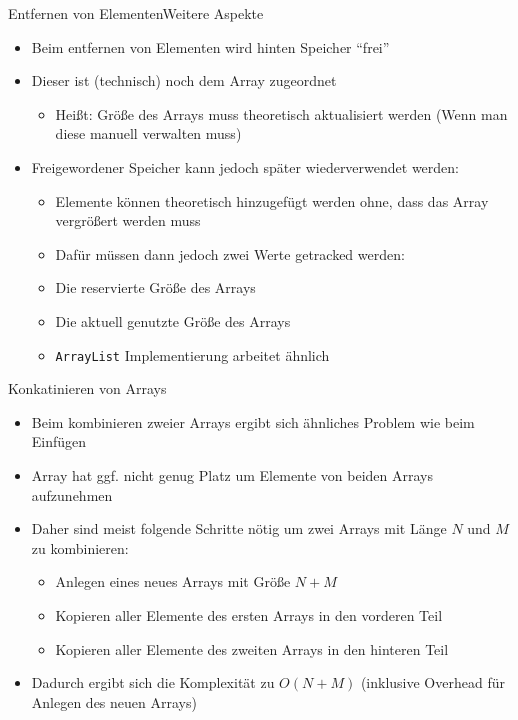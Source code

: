 \begin{frame}{Entfernen von Elementen}{Weitere Aspekte}
	\begin{itemize}
		\item Beim entfernen von Elementen wird hinten Speicher "`frei"'
		\item Dieser ist (technisch) noch dem Array zugeordnet
		\begin{itemize}
			\item Heißt: Größe des Arrays muss theoretisch aktualisiert werden (Wenn man diese manuell verwalten muss)
		\end{itemize}
		\item Freigewordener Speicher kann jedoch später wiederverwendet werden:
		\begin{itemize}
			\item Elemente können theoretisch hinzugefügt werden ohne, dass das Array vergrößert werden muss
			\item Dafür müssen dann jedoch zwei Werte getracked werden:
			\item Die reservierte Größe des Arrays
			\item Die aktuell genutzte Größe des Arrays
			\item \texttt{ArrayList} Implementierung arbeitet ähnlich
		\end{itemize}
	\end{itemize}
\end{frame}

\begin{frame}{Konkatinieren von Arrays}
	\begin{itemize}
		\item Beim kombinieren zweier Arrays ergibt sich ähnliches Problem wie beim Einfügen
		\item Array hat ggf. nicht genug Platz um Elemente von beiden Arrays aufzunehmen
		\item Daher sind meist folgende Schritte nötig um zwei Arrays mit Länge $N$ und $M$ zu kombinieren:
		\begin{itemize}
			\item Anlegen eines neues Arrays mit Größe $N+M$
			\item Kopieren aller Elemente des ersten Arrays in den vorderen Teil
			\item Kopieren aller Elemente des zweiten Arrays in den hinteren Teil
		\end{itemize}
		\item Dadurch ergibt sich die Komplexität zu $O(N+M)$ (inklusive Overhead für Anlegen des neuen Arrays)
	\end{itemize}
\end{frame}

